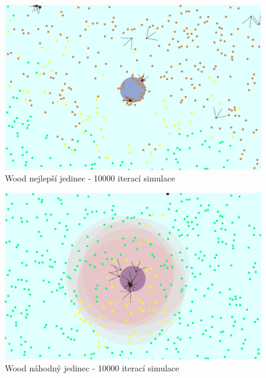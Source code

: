 	\clearpage 
	\begin{figure}[p]\centering
		\includegraphics[width=\columnwidth]{../img/WoodMap/pictures/end.png}
		\caption{Wood nejlepší jedinec - 10000 iterací simulace}
		\label{obr04:bestEnd}
	\end{figure}
	\begin{figure}[p]\centering
		\includegraphics[width=\columnwidth]{../img/WoodMap/pictures/EndRandom.png}
		\caption{Wood náhodný jedinec - 10000 iterací simulace}
		\label{obr04:randomEnd}
	\end{figure}
	\clearpage
